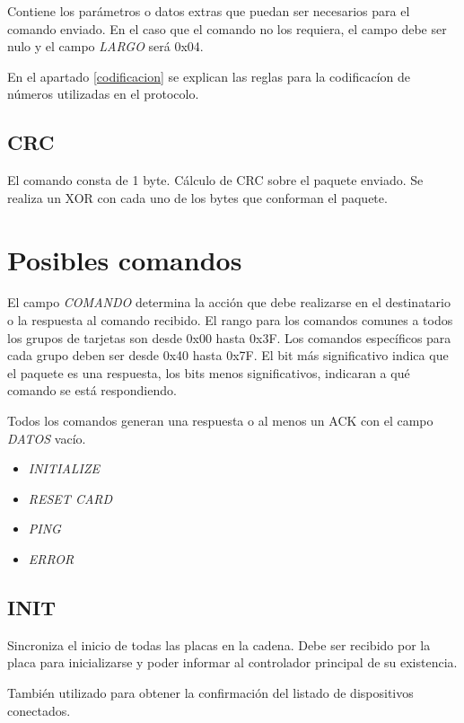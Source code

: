 \documentclass[a4paper,10pt]{article}
\begin{document}
	Contiene los par\'ametros o datos extras que puedan ser necesarios para el comando enviado.
	En el caso que el comando no los requiera, el campo debe ser nulo y el campo \emph{LARGO} ser\'a 0x04.

	En el apartado \ref{codificacion} se explican las reglas para la codificac\'ion de n\'umeros utilizadas en el protocolo.

\subsection{CRC}
\label{crc}

	El comando consta de 1 byte.
	C\'alculo de CRC sobre el paquete enviado.
	Se realiza un XOR con cada uno de los bytes que conforman el paquete.

\section{Posibles comandos}
\label{comandos}

El campo \emph{COMANDO} determina la acci\'on que debe realizarse en el destinatario o la respuesta al comando recibido.
El rango para los comandos comunes a todos los grupos de tarjetas son desde 0x00 hasta 0x3F.
Los comandos espec\'ificos para cada grupo deben ser desde 0x40 hasta 0x7F.
El bit m\'as significativo indica que el paquete es una respuesta, los bits menos significativos, indicaran a qu\'e comando se est\'a respondiendo.

Todos los comandos generan una respuesta o al menos un ACK con el campo \emph{DATOS} vac\'io.

\begin{itemize}
	\item \emph{INITIALIZE}
	\item \emph{RESET CARD}
	\item \emph{PING}
	\item \emph{ERROR}
\label{lista_comandos}
\end{itemize}

\subsection{INIT}
\label{init}

Sincroniza el inicio de todas las placas en la cadena.
Debe ser recibido por la placa para inicializarse y poder informar al controlador principal de su existencia.

Tambi\'en utilizado para obtener la confirmaci\'on del listado de dispositivos conectados.
\end{document}
